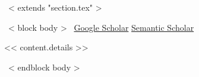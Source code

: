 ~< extends "section.tex" >~

~< block body >~
\vspace{-8mm}
\hfill
\href{https://scholar.google.com/citations?user=<< scholar_id >>}{Google Scholar}
\href{https://www.semanticscholar.org/author/<< semantic_id >>}{Semantic Scholar}
\vspace{2mm}



<< content.details >>

~< endblock body >~